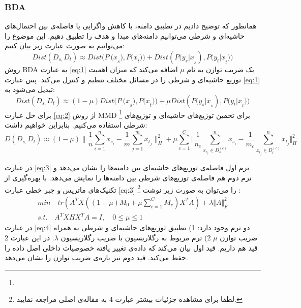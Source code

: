 {{	 	\subsubsection{BDA}
	 	{
 		همانطور که توضیح دادیم در تطبیق دامنه، با کاهش واگرایی یا فاصله‌ی بین احتمال‌های حاشیه‌ای و شرطی می‌توانیم دامنه‌های مبدا و هدف را تطبیق دهیم. این موضوع را می‌توانیم به صورت عبارت زیر بیان کنیم:
 		\begin{equation}
 			Dist\left(D_{s,}D_t\right)\approx Dist{(P\ (x}_s),{P(x}_t))+Dist({P(y_s|x}_s),{P(y_t|x}_t))
 			\label{eq:1}
 		\end{equation}
 		روش BDA به عبارت 
 		\ref{eq:1}
 		 یک ضریب توازن به نام $\mu$ اضافه می‌کند که میزان اهمیت توزیع حاشیه‌ا‌ی و شرطی را در مسائل مختلف تنظیم و کنترل می‌کند. پس عبارت 
 		\ref{eq:1}
 		 تبدیل می‌شود به:
 		 \begin{equation}
 			Dist\left(D_{s,}D_t\right)\approx(1-\mu)Dist{(P\ (x}_s),{P(x}_t))+\mu Dist({P(y_s|x}_s),{P(y_t|x}_t))
 			\label{eq:2}
 		 \end{equation}
 		  برای حل عبارت 
 		  \ref{eq:2}
 		  از روش MMD 
 		  \footnote{}
 		  برای تخمین توزیع‌های حاشیه‌ای و توزیع‌های شرطی استفاده می‌کنیم. بنابراین خواهیم داشت:
 		  \begin{equation}
 		  	 D \left( D_{s,}D_{t} \right)  \approx  \left( 1- \mu  \right)  \bigg \|\frac{1}{n} \sum _{i=1}^{n}x_{s_{i}} - \frac{1}{m} \sum _{j=1}^{m}x_{t_{j}}\bigg \| _{H}^{2} + \mu \sum _{c=1}^{C} \bigg \Vert \frac{1}{n_{c}} \sum _{x_{s_{i}} \in  D_{s}^{ \left( c \right) }}^{n}x_{s_{i}} - \frac{1}{m_{c}} \sum _{x_{t_{j}} \in  D_{t}^{ \left( c \right) }}^{n}x_{t_{j}} \bigg \Vert _{H}^{2}
 		  	 \label{eq:3}
 		  \end{equation}
 		  
 		  در عبارت 
 		 \ref{eq:3}
 		  ترم اول فاصله‌ی توزیع‌های حاشیه‌ای بین دامنه‌ها را نشان می‌دهد و ترم دوم هم فاصله‌ی توزیع‌های شرطی بین دامنه‌ها را نمایش می‌دهد. با بهره‌گیری از تکنیک‌های ماتریس و جبر خطی عبارت 
 		 \ref{eq:3}
 		  را می‌توان به صورت زیر نوشت
 		  \footnote{لطفا برای مشاهده جزئیات بیشتر عبارت 4 به مقاله‌ی اصلی مراجعه نمایید.}
 		  :
 		  \begin{equation}
	 	  \begin{aligned}
		  min \quad tr \left( A^{T}X \left( \left( 1 - \mu \right) M_{0} + \mu \sum _{c=1\mathrm{ }}^{C}M_{c} \right) X^{T}A \right) + \lambda \Vert A \Vert_{F}^{2} \\
		  s.t. \quad A^{T}XHX^{T}A = I, \quad  0  \leq \mu \leq  1 \quad \quad \quad \quad \quad
		  \label{eq:4}
	 	  \end{aligned}
 		  \end{equation}
 		   در عبارت
 		   \ref{eq:4}
 		    دو ترم وجود دارد: 1) تطبیق توزیع‌های حاشیه‌ای و شرطی به همراه ضریب توازن $\mu$ 2) ترم مربوط به رگلاریسیون با ضریب رگلاریسیون $\lambda$. در این عبارت 2 قید هم داریم. قید اول بیان می‌کند که داده‌ی تغییر یافته خصوصیات داخلی اصل داده را حفظ می‌کند. قید دوم نیز بازه‌ی ضریب توازن را نشان می‌دهد.
 		    
}}}
